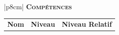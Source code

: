 \documentclass[11pt,twoside,a4paper]{article}
\def\FRdefCompetences{Comp{\'e}tences}
\def\FRdefCompetencesTitleTable{\textbf{Nom} & \textbf{Niveau} & \textbf{Niveau Relatif}}
\begin{document}
\begin{multicols}{2}
	\begin{tabular}[c]{|p{8cm}|}
		\hline
		\textbf{\textsc{\FRdefCompetences}} \\ 
		\begin{tabular}[c]{p{2cm} p{1.5cm} p{3cm}}
			\FRdefCompetencesTitleTable \\
		\end{tabular} \\ 
		\dotfill  [~~]	\\ 
		\dotfill  [~~]	\\ 
		\dotfill  [~~]	\\ 
		\dotfill  [~~]	\\ 
		\dotfill  [~~]	\\ 
		\dotfill  [~~]	\\
		\dotfill  [~~]	\\ 
		\dotfill  [~~]	\\ 
		\dotfill  [~~]	\\ 
		\dotfill  [~~]	\\ 
		\dotfill  [~~]	\\ 
		\dotfill  [~~]	\\ 
		\dotfill  [~~]	\\ 
		\dotfill  [~~]	\\ 
		\dotfill  [~~]	\\ 
		\dotfill  [~~]	\\ 
		\dotfill  [~~]	\\ 
		\dotfill  [~~]	\\ 
		\dotfill  [~~]	\\ 
		\dotfill  [~~]	\\ 
		\dotfill  [~~]	\\ 
		\dotfill  [~~]	\\ 
		\dotfill  [~~]	\\ 
		\dotfill  [~~]	\\ 
		\dotfill  [~~]	\\ 
		\dotfill  [~~]	\\ 
		\dotfill  [~~]	\\ 
		\dotfill  [~~]	\\ 
		\dotfill  [~~]	\\ 
		\dotfill  [~~]	\\ 
		\dotfill  [~~]	\\ 
		\hline
	\end{tabular}~\\
\end{multicols}

\clearpage
\end{document}
